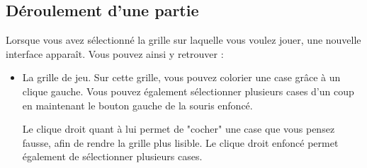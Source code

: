 \documentclass[a4paper, 12pt]{report}
\begin{document}
            
        \subsection{Déroulement d'une partie}
        
            Lorsque vous avez sélectionné la grille sur laquelle vous voulez jouer, une nouvelle interface apparaît. 
            Vous pouvez ainsi y retrouver :
            \begin{itemize}
                \item La grille de jeu.
                Sur cette grille, vous pouvez colorier une case grâce à un clique gauche. Vous pouvez également sélectionner plusieurs cases d'un coup en maintenant le bouton gauche de la souris enfoncé.
                
                Le clique droit quant à lui permet de "cocher" une case que vous pensez fausse, afin de rendre la grille plus lisible. Le clique droit enfoncé permet également de sélectionner plusieurs cases.
                

\end{itemize}
\end{document}

